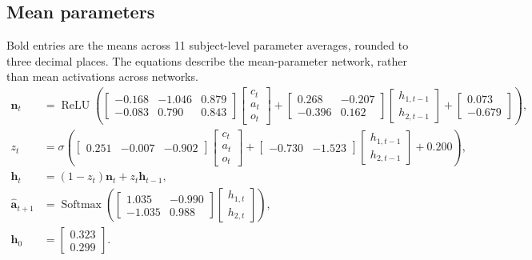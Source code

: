 \documentclass[10pt,a4paper]{article}
\begin{document}
\subsection*{Mean parameters}
Bold entries are the means across 11 subject-level parameter averages, rounded to three decimal places. The equations describe the mean-parameter network, rather than mean activations across networks.
\begingroup\small\setlength{\arraycolsep}{3pt}
\begin{align*}
\mathbf n_t &= \operatorname{ReLU}\!\left(\begin{bmatrix}\boldsymbol{-0.168} & \boldsymbol{-1.046} & \boldsymbol{0.879} \\ \boldsymbol{-0.083} & \boldsymbol{0.790} & \boldsymbol{0.843}\end{bmatrix}\begin{bmatrix}c_t \\ a_t \\ o_t\end{bmatrix} + \begin{bmatrix}\boldsymbol{0.268} & \boldsymbol{-0.207} \\ \boldsymbol{-0.396} & \boldsymbol{0.162}\end{bmatrix}\begin{bmatrix}h_{1,t-1} \\ h_{2,t-1}\end{bmatrix} + \begin{bmatrix}\boldsymbol{0.073} \\ \boldsymbol{-0.679}\end{bmatrix}\right), \\[1em]
z_t &= \sigma\!\left(\begin{bmatrix}\boldsymbol{0.251} & \boldsymbol{-0.007} & \boldsymbol{-0.902}\end{bmatrix}\begin{bmatrix}c_t \\ a_t \\ o_t\end{bmatrix} + \begin{bmatrix}\boldsymbol{-0.730} & \boldsymbol{-1.523}\end{bmatrix}\begin{bmatrix}h_{1,t-1} \\ h_{2,t-1}\end{bmatrix} + \boldsymbol{0.200}\right), \\[1em]
\mathbf h_t &= (1-z_t)\mathbf n_t + z_t\mathbf h_{t-1}, \\[1em]
\hat{\mathbf a}_{t+1} &= \operatorname{Softmax}\!\left(\begin{bmatrix}\boldsymbol{1.035} & \boldsymbol{-0.990} \\ \boldsymbol{-1.035} & \boldsymbol{0.988}\end{bmatrix}\begin{bmatrix}h_{1,t} \\ h_{2,t}\end{bmatrix}\right), \\[1em]
\mathbf h_0 &= \begin{bmatrix}\boldsymbol{0.323} \\ \boldsymbol{0.299}\end{bmatrix}.
\end{align*}\endgroup
\end{document}
